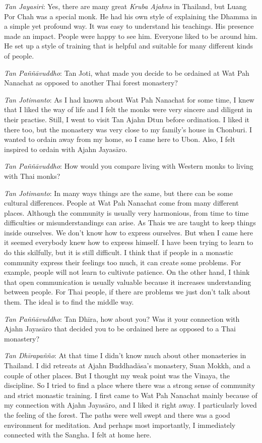 \emph{Tan Jayasiri}: Yes, there are many great \emph{Kruba Ajahns}
in Thailand, but Luang Por Chah was a special monk. He had
his own style of explaining the Dhamma in a simple yet profound way. It
was easy to understand his teachings. His presence made an impact. 
People were happy to see him. Everyone liked to be around him. He set up
a style of training that is helpful and suitable for many different
kinds of people. 

\clearpage

\emph{Tan Paññāvuddho}: Tan Joti, what made you decide to be ordained
at Wat Pah Nanachat as opposed to another Thai forest monastery? 

\emph{Tan Jotimanto}: As I had known about Wat Pah Nanachat for some
time, I knew that I liked the way of life and I felt the monks were very
sincere and diligent in their practise. Still, I went to visit Tan Ajahn
Dtun before ordination. I liked it there too, but the monastery was very
close to my family's house in Chonburi. I wanted to ordain away from my
home, so I came here to Ubon. Also, I felt inspired to ordain with Ajahn
Jayasāro. 

\emph{Tan Paññāvuddho}: How would you compare living with Western monks
to living with Thai monks? 

\emph{Tan Jotimanto}: In many ways things are the same, but there can be
some cultural differences. People at Wat Pah Nanachat come from many
different places. Although the community is usually very harmonious, 
from time to time difficulties or misunderstandings can arise. As Thais
we are taught to keep things inside ourselves. We don't know how to
express ourselves. But when I came here it seemed everybody knew how to
express himself. I have been trying to learn to do this skilfully, but
it is still difficult. I think that if people in a monastic community
express their feelings too much, it can create some problems. For
example, people will not learn to cultivate patience. On the other hand, 
I think that open communication is usually valuable because it increases
understanding between people. For Thai people, if there are problems we
just don't talk about them. The ideal is to find the middle way. 

\emph{Tan Paññāvuddho}: Tan Dhīra, how about you? Was it your
connection with Ajahn Jayasāro that decided you to be ordained here as
opposed to a Thai monastery? 

\emph{Tan Dhīrapañño}: At that time I didn't know much about other
monasteries in Thailand. I did retreats at Ajahn Buddhadāsa's monastery, 
Suan Mokkh, and a couple of other places. But I thought my weak point
was the Vinaya, the discipline. So I tried to find a place where there
was a strong sense of community and strict monastic training. I first
came to Wat Pah Nanachat mainly because of my connection with Ajahn
Jayasāro, and I liked it right away. I particularly loved the feeling of
the forest. The paths were well swept and there was a good environment
for meditation. And perhaps most importantly, I immediately connected
with the Sangha. I felt at home here. 

